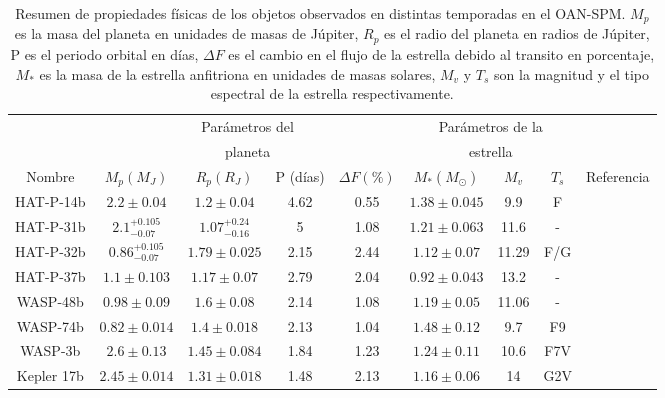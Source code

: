 \begin{table}
\hspace{-1.7cm}
\begin{footnotesize}
\begin{tabular}{ccccccccc}
\hline 
 & \multicolumn{4}{c}{Parámetros del} & \multicolumn{3}{c}{Parámetros de la} &  \\
 & \multicolumn{4}{c}{planeta} & \multicolumn{3}{c}{estrella} & \\
\hline 
Nombre & $M_{p} (M_{J}) $ & $R_{p} (R_{J}) $ &  P (días) & $\Delta F (\%)$ & $M_{*} (M_{\odot})$ & $M_{v}$ & $T_{s}$ & Referencia \\ 
\hline 
HAT-P-14b & $2.2\pm 0.04 $ & $1.2\pm 0.04 $ & 4.62 & 0.55 & $1.38\pm 0.045$ & 9.9 & F & \cite{torres2010hat} \\ 
HAT-P-31b & $2.1^{+0.105}_{-0.07} $ & $1.07^{+0.24}_{-0.16} $ & 5 & 1.08 & $1.21\pm 0.063$ & 11.6 & - & \cite{kipping2011hat} \\
HAT-P-32b & $0.86^{+0.105}_{-0.07} $ & $1.79\pm 0.025 $ & 2.15 & 2.44 & $1.12\pm 0.07$ & 11.29 & F/G & \cite{hartman2011hat} \\  
HAT-P-37b & $1.1\pm 0.103 $ & $1.17\pm 0.07 $ & 2.79 & 2.04 & $0.92\pm 0.043$ & 13.2 & - & \cite{bakos2012hat} \\
WASP-48b & $0.98\pm 0.09 $ & $1.6\pm 0.08 $ & 2.14 & 1.08 & $1.19\pm 0.05$ & 11.06 & - & \cite{enoch2011wasp} \\
WASP-74b & $0.82\pm 0.014 $ & $1.4\pm 0.018 $ & 2.13 & 1.04 & $1.48\pm 0.12$ & 9.7 & F9 & \cite{hellier2015three} \\
WASP-3b & $2.6\pm 0.13 $ & $1.45\pm 0.084 $ & 1.84 & 1.23 & $1.24\pm 0.11$ & 10.6 & F7V & \cite{pollacco2008wasp} \\
Kepler 17b & $2.45\pm 0.014 $ & $1.31\pm 0.018 $ & 1.48 & 2.13 & $1.16\pm 0.06$ & 14 & G2V & \cite{desert2011hot} \\
\hline 
\end{tabular} 
\end{footnotesize}
\caption{Resumen de propiedades físicas de los objetos observados en distintas temporadas en el OAN-SPM. $M_{p}$ es la masa del planeta en unidades de masas de Júpiter, $R_{p}$ es el radio del planeta en radios de Júpiter, P es el periodo orbital en días, $\Delta F$ es el cambio en el flujo de la estrella debido al transito en porcentaje, $M_{*}$ es la masa de la estrella anfitriona en unidades de masas solares, $M_{v}$ y $T_{s}$ son la magnitud y el tipo espectral de la estrella respectivamente.}
\label{tab:tab_objetivos}
\end{table}

